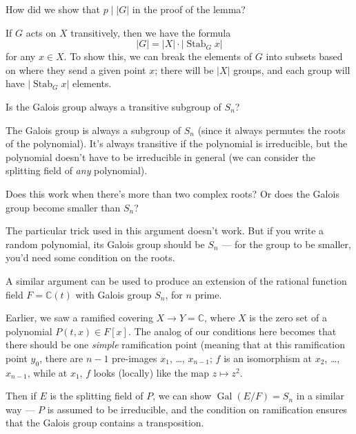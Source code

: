 \begin{question}
How did we show that $p \mid \lvert G\rvert$ in the proof of the lemma?
\end{question}

\begin{ans}
If $G$ acts on $X$ transitively, then we have the formula \[\lvert G \rvert = \lvert X\rvert \cdot \lvert \operatorname{Stab}_G x\rvert\] for any $x \in X$. To show this, we can break the elements of $G$ into subsets based on where they send a given point $x$; there will be $\lvert X\rvert$ groups, and each group will have $\lvert \operatorname{Stab}_G x\rvert$ elements. 
\end{ans}

\begin{question}
    Is the Galois group always a transitive subgroup of $S_n$?
\end{question}

\begin{ans}
    The Galois group is always a subgroup of $S_n$ (since it always permutes the roots of the polynomial). It's always transitive if the polynomial is irreducible, but the polynomial doesn't have to be irreducible in general (we can consider the splitting field of \emph{any} polynomial). 
\end{ans}

\begin{question}
Does this work when there's more than two complex roots? Or does the Galois group become smaller than $S_n$?
\end{question}

\begin{ans}
The particular trick used in this argument doesn't work. But if you write a random polynomial, its Galois group should be $S_n$ --- for the group to be smaller, you'd need some condition on the roots. 
\end{ans}

\begin{note}
    A similar argument can be used to produce an extension of the rational function field $F = \mathbb{C}(t)$ with Galois group $S_n$, for $n$ prime. 
    
    Earlier, we saw a ramified covering $X \to Y = \mathbb{C}$, where $X$ is the zero set of a polynomial $P(t, x) \in F[x]$. The analog of our conditions here becomes that there should be one \emph{simple} ramification point (meaning that at this ramification point $y_0$, there are $n - 1$ pre-images $x_1$, \ldots, $x_{n - 1}$; $f$ is an isomorphism at $x_2$, \ldots, $x_{n - 1}$, while at $x_1$, $f$ looks (locally) like the map $z \mapsto z^2$. 
    
    Then if $E$ is the splitting field of $P$, we can show $\operatorname{Gal}(E/F) = S_n$ in a similar way --- $P$ is assumed to be irreducible, and the condition on ramification ensures that the Galois group contains a transposition.
\end{note}

